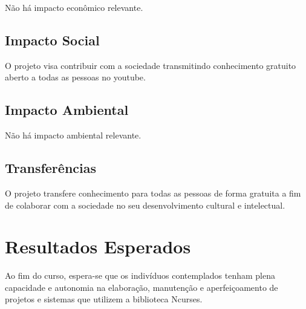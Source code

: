 \documentclass[a4paper,10pt]{article} %
\begin{document}
Não há impacto econômico relevante.

\subsection{Impacto Social}

O projeto visa contribuir com a sociedade transmitindo conhecimento gratuito aberto a todas as pessoas no youtube.

\subsection{Impacto Ambiental}

Não há impacto ambiental relevante.

\subsection{Transferências}

O projeto transfere conhecimento para todas as pessoas de forma gratuita a fim de colaborar com a sociedade no seu desenvolvimento cultural e intelectual.


\section{Resultados Esperados}
Ao fim do curso, espera-se que os indivíduos contemplados tenham plena capacidade e autonomia na elaboração, manutenção e aperfeiçoamento de  projetos e sistemas que utilizem a biblioteca Ncurses.


\nocite{*}

\end{document}
